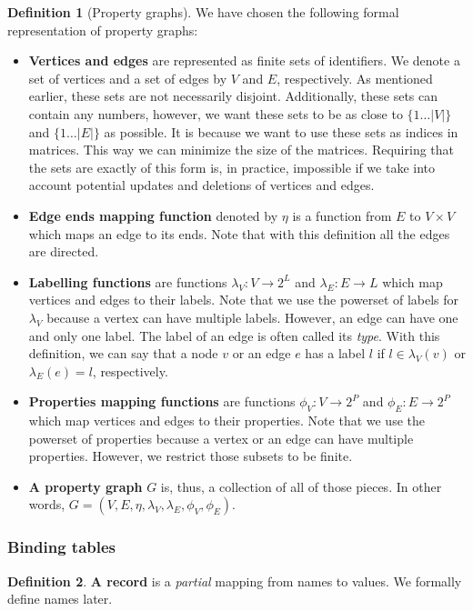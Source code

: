 \documentclass[14pt]{constructor-thesis}
\theoremstyle{definition}
\newtheorem*{definition}{Definition}
\begin{document}
\begin{definition}[Property graphs]
  We have chosen the following formal representation of property graphs:
  \begin{itemize}
    \item \textbf{Vertices and edges} are represented as finite sets of identifiers. We denote a set of vertices and a set of edges by $V$ and $E$, respectively. As mentioned earlier, these sets are not necessarily disjoint. Additionally, these sets can contain any numbers, however, we want these sets to be as close to $\{1 \dots |V|\}$ and $\{1 \dots |E|\}$ as possible. It is because we want to use these sets as indices in matrices. This way we can minimize the size of the matrices. Requiring that the sets are exactly of this form is, in practice, impossible if we take into account potential updates and deletions of vertices and edges.
    \item \textbf{Edge ends mapping function} denoted by $\eta$ is a function from $E$ to $V \times V$ which maps an edge to its ends. Note that with this definition all the edges are directed.
    \item \textbf{Labelling functions} are functions $\lambda_V : V \to 2^L$ and $\lambda_E : E \to L$ which map vertices and edges to their labels. Note that we use the powerset of labels for $\lambda_V$ because a vertex can have multiple labels. However, an edge can have one and only one label. The label of an edge is often called its \textit{type}. With this definition, we can say that a node $v$ or an edge $e$ has a label $l$ if $l \in \lambda_V(v)$ or $\lambda_E(e) = l$, respectively.
    \item \textbf{Properties mapping functions} are functions $\phi_V : V \to 2^P$ and $\phi_E : E \to 2^P$ which map vertices and edges to their properties. Note that we use the powerset of properties because a vertex or an edge can have multiple properties. However, we restrict those subsets to be finite.
    \item \textbf{A property graph} $G$ is, thus, a collection of all of those pieces. In other words, $G = (V, E, \eta, \lambda_V, \lambda_E, \phi_V, \phi_E)$.
  \end{itemize}
\end{definition}

\subsubsection{Binding tables}

\begin{definition}
  \textbf{A record} is a \textit{partial} mapping from names to values. We formally define names later.
\end{definition}
\end{document}
